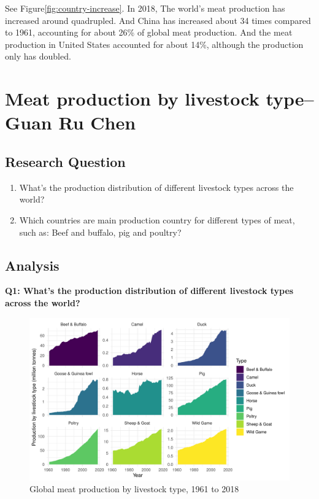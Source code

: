 \documentclass[11pt,a4paper,]{article}
\begin{document}
See Figure\ref{fig:country-increase}. In 2018, The world's meat production has increased around quadrupled. And China has increased about 34 times compared to 1961, accounting for about 26\% of global meat production. And the meat production in United States accounted for about 14\%, although the production only has doubled.

\clearpage

\section*{Meat production by livestock type-- Guan Ru Chen}

\subsection*{Research Question}

\begin{enumerate}
\def\labelenumi{\arabic{enumi}.}
\item
  What's the production distribution of different livestock types across the world?
\item
  Which countries are main production country for different types of meat, such as: Beef and buffalo, pig and poultry?
\end{enumerate}

\subsection*{Analysis}

\textbf{Q1: What's the production distribution of different livestock types across the world?}

\begin{figure}
\centering
\includegraphics{report_files/figure-latex/productiontype-1.pdf}
\caption{\label{fig:productiontype}Global meat production by livestock type, 1961 to 2018}
\end{figure}
\end{document}
